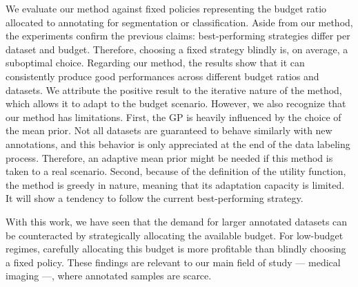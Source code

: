 We evaluate our method against fixed policies representing the budget ratio allocated to annotating for segmentation or classification. Aside from our method, the experiments confirm the previous claims: best-performing strategies differ per dataset and budget. Therefore, choosing a fixed strategy blindly is, on average, a suboptimal choice. Regarding our method, the results show that it can consistently produce good performances across different budget ratios and datasets. We attribute the positive result to the iterative nature of the method, which allows it to adapt to the budget scenario. However, we also recognize that our method has limitations. First, the GP is heavily influenced by the choice of the mean prior. Not all datasets are guaranteed to behave similarly with new annotations, and this behavior is only appreciated at the end of the data labeling process. Therefore, an adaptive mean prior might be needed if this method is taken to a real scenario. Second, because of the definition of the utility function, the method is greedy in nature, meaning that its adaptation capacity is limited. It will show a tendency to follow the current best-performing strategy.

With this work, we have seen that the demand for larger annotated datasets can be counteracted by strategically allocating the available budget. For low-budget regimes, carefully allocating this budget is more profitable than blindly choosing a fixed policy. These findings are relevant to our main field of study --- medical imaging ---, where annotated samples are scarce.

